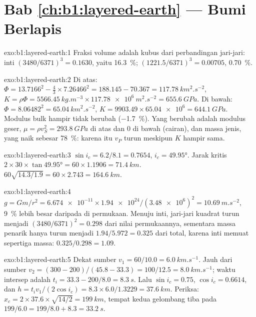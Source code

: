 \section*{Bab \ref{ch:b1:layered-earth} --- Bumi Berlapis}

\begin{solution}{exo:b1:layered-earth:1}
Fraksi volume adalah kubus dari perbandingan jari-jari: inti $(3480/6371)^3 = 0.1630$, yaitu \qty{16.3}{\percent};  $(1221.5/6371)^3 = 0.00705$, \qty{0.70}{\percent}.
\end{solution}

\begin{solution}{exo:b1:layered-earth:2}
Di atas: $\Phi = 13.7166^2 - \tfrac43\times7.26466^2 = 188.145 - 70.367 =
\qty{117.78}{km^2.s^{-2}}$, $K = \rho\Phi = \qty{5566.45}{kg.m^{-3}}\times
\qty{117.78e6}{m^2.s^{-2}} = \qty{655.6}{GPa}$. Di bawah: $\Phi = 8.06482^2 =
\qty{65.04}{km^2.s^{-2}}$, $K = 9903.49\times\num{65.04e6} = \qty{644.1}{GPa}$.
Modulus bulk hampir tidak berubah (\qty{-1.7}{\percent}). Yang berubah adalah modulus geser, $\mu = \rho v_S^2 = \qty{293.8}{GPa}$ di atas dan $0$ di bawah (cairan), dan massa jenis, yang naik sebesar \qty{78}{\percent}: karena itu $v_P$ turun meskipun $K$ hampir sama.
\end{solution}

\begin{solution}{exo:b1:layered-earth:3}
$\sin i_c = 6.2/8.1 = 0.7654$, $i_c = \ang{49.95}$. Jarak kritis
$2\times30\times\tan\ang{49.95} = 60\times1.1906 = \qty{71.4}{km}$.  $60\sqrt{14.3/1.9} = 60\times2.743 = \qty{164.6}{km}$.
\end{solution}

\begin{solution}{exo:b1:layered-earth:4}
$g = Gm/r^2 = \num{6.674e-11}\times\num{1.94e24}/(\num{3.48e6})^2 =
\qty{10.69}{m.s^{-2}}$, \qty{9}{\percent} lebih besar daripada di permukaan. Menuju inti, jari-jari kuadrat turun menjadi $(3480/6371)^2 = 0.298$ dari nilai permukaannya, sementara massa penarik hanya turun menjadi $1.94/5.972 = 0.325$ dari total, karena inti memuat sepertiga massa: $0.325/0.298 = 1.09$.
\end{solution}

\begin{solution}{exo:b1:layered-earth:5}
Dekat sumber $v_1 = 60/10.0 = \qty{6.0}{km.s^{-1}}$. Jauh dari sumber
$v_2 = (300 - 200)/(45.8 - 33.3) = 100/12.5 = \qty{8.0}{km.s^{-1}}$; waktu intersep adalah $t_i = 33.3 - 200/8.0 = \qty{8.3}{s}$. Lalu $\sin i_c =
0.75$, $\cos i_c = 0.6614$, dan $h = t_i v_1/(2\cos i_c) = 8.3\times6.0/1.3229
= \qty{37.6}{km}$. Periksa: $x_c = 2\times37.6\times\sqrt{14/2} = \qty{199}{km}$,
tempat kedua gelombang tiba pada $199/6.0 = 199/8.0 + 8.3 = \qty{33.2}{s}$.
\end{solution}

